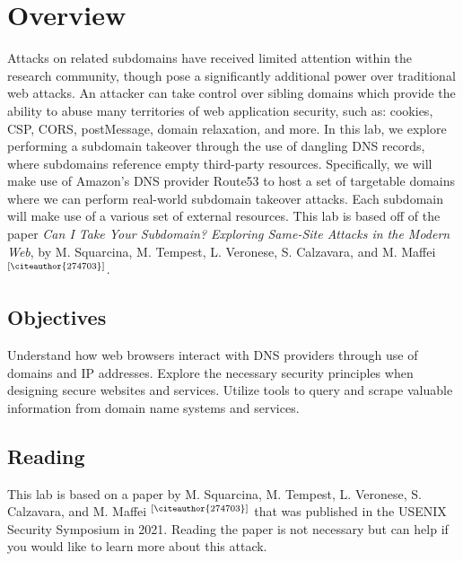 \documentclass[letterpaper,12pt]{report}
\begin{document}
\clearpage
{}
\settableofcontents
\tableofcontents
\clearpage


\section*{Overview}\label{sec:overview}

Attacks on related subdomains have received limited attention within the research community, though pose a significantly additional power over traditional web attacks. An attacker can take control over sibling domains which provide the ability to abuse many territories of web application security, such as: cookies, CSP, CORS, postMessage, domain relaxation, and more. In this lab, we explore performing a subdomain takeover through the use of dangling DNS records, where subdomains reference empty third-party resources. Specifically, we will make use of Amazon’s DNS provider Route53 to host a set of targetable domains where we can perform real-world subdomain takeover attacks. Each subdomain will make use of a various set of external resources. This lab is based off of the paper \emph{Can I Take Your Subdomain? Exploring Same-Site Attacks in the Modern Web}, by M. Squarcina, M. Tempest, L. Veronese, S. Calzavara, and M. Maffei $^{\text{[\citeauthor{274703}}]}$. 

\subsection*{Objectives}

Understand how web browsers interact with DNS providers through use of domains and IP addresses. Explore the necessary security principles when designing secure websites and services. Utilize tools to query and scrape valuable information from domain name systems and services.

\subsection*{Reading}

This lab is based on a paper by M. Squarcina, M. Tempest, L. Veronese, S. Calzavara, and M. Maffei $^{\text{[\citeauthor{274703}}]}$ that was published in the USENIX Security Symposium in 2021. Reading the paper is not necessary but can help if you would like to learn more about this attack. 
\end{document}
